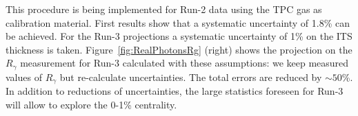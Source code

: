 This procedure is being implemented for Run-2 data using the TPC gas as calibration material. First results show that a systematic uncertainty of 1.8\% can be achieved. For the Run-3 projections a systematic uncertainty of 1\% on the ITS thickness is taken.
Figure~\ref{fig:RealPhotonsRg} (right) shows the projection on the $R_\gamma$ measurement 
for Run-3 calculated with these assumptions: we keep measured values of $R_\gamma$ but re-calculate uncertainties. The total errors are reduced by $\sim50$\%. In addition to reductions of uncertainties, the large statistics foreseen for Run-3 will allow to explore the 0-1\% centrality. 




